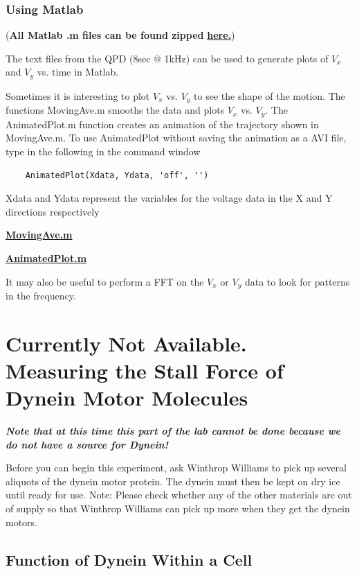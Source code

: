\documentclass{../lab}
\begin{document}
\subsubsection{Using Matlab}

(\textbf{All Matlab .m files can be found zipped }\href{https://berkeley-physics111b.github.io/assets/pdf/oldwebsitestructure/ZIP\_files/OTZ\_Matlab\_files.zip}{\textbf{here.}})

The text files from the QPD (8sec @ 1kHz) can be used to generate plots of $V_x$ and $V_y$ vs. time in Matlab.

Sometimes it is interesting to plot $V_x$ vs. $V_y$ to see the shape of the motion. The functions MovingAve.m smooths the data and plots $V_x$ vs. $V_y$. The AnimatedPlot.m function creates an animation of the trajectory shown in MovingAve.m. To use AnimatedPlot without saving the animation as a AVI file, type in the following in the command window
\begin{verbatim}
    AnimatedPlot(Xdata, Ydata, 'off', '')
\end{verbatim}
Xdata and Ydata represent the variables for the voltage data in the X and Y directions respectively

\href{https://berkeley-physics111b.github.io/assets/pdf/oldwebsitestructure/matlab\_fitting/MovingAve.m}{\textbf{MovingAve.m}}

\href{https://berkeley-physics111b.github.io/assets/pdf/oldwebsitestructure/matlab\_fitting/AnimatedPlot.m}{\textbf{AnimatedPlot.m}}

It may also be useful to perform a FFT on the $V_x$ or $V_y$ data to look for patterns in the frequency.

\section{Currently Not Available. Measuring the Stall Force of Dynein Motor Molecules}

\emph{\textbf{Note that at this time this part of the lab cannot be done because we do not have a source for Dynein!}}

Before you can begin this experiment, ask Winthrop Williams to pick up several aliquots of the dynein motor protein. The dynein must then be kept on dry ice until ready for use.  Note: Please check whether any of the other materials are out of supply so that Winthrop Williams can pick up more when they get the dynein motors.

\subsection{Function of Dynein Within a Cell}
\end{document}
